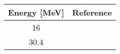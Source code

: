 \begin{tabular}{|c||c|} 
    \hline 
    \bf{Energy [MeV]} & \bf{Reference} \\
    \hline
    \hline 
    16 & \cite{Makofske68}\\
    30.4 & \cite{Hardacre71}\\
    \hline
\end{tabular}
